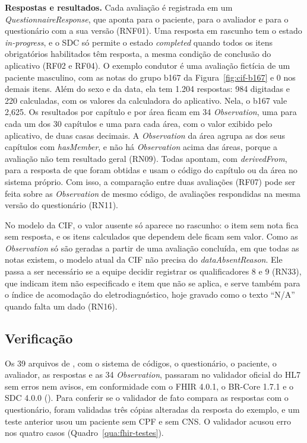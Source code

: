 \textbf{Respostas e resultados.} Cada avaliação é registrada em um \textit{QuestionnaireResponse}, que aponta para o
paciente, para o avaliador e para o questionário com a sua versão (RNF01). Uma resposta em rascunho tem o estado
\textit{in-progress}, e o SDC só permite o estado \textit{completed} quando todos os itens obrigatórios habilitados
têm resposta, a mesma condição de conclusão do aplicativo (RF02 e RF04). O exemplo condutor é uma avaliação fictícia
de um paciente masculino, com as notas do grupo b167 da Figura~\ref{fig:cif-b167} e 0 nos demais itens. Além do sexo
e da data, ela tem 1.204 respostas: 984 digitadas e 220 calculadas, com os valores da calculadora do aplicativo.
Nela, o b167 vale 2,625. Os resultados por capítulo e por área ficam em 34 \textit{Observation}, uma para cada um dos
30 capítulos e uma para cada área, com o valor exibido pelo aplicativo, de duas casas decimais. A
\textit{Observation} da área agrupa as dos seus capítulos com \textit{hasMember}, e não há \textit{Observation} acima
das áreas, porque a avaliação não tem resultado geral (RN09). Todas apontam, com \textit{derivedFrom}, para a resposta
de que foram obtidas e usam o código do capítulo ou da área no sistema próprio. Com isso, a comparação entre duas
avaliações (RF07) pode ser feita sobre as \textit{Observation} de mesmo código, de avaliações respondidas na mesma
versão do questionário (RN11).

No modelo da CIF, o valor ausente só aparece no rascunho: o item sem nota fica sem resposta, e os itens calculados que
dependem dele ficam sem valor. Como as \textit{Observation} só são geradas a partir de uma avaliação concluída, em que
todas as notas existem, o modelo atual da CIF não precisa do \textit{dataAbsentReason}. Ele passa a ser necessário se
a equipe decidir registrar os qualificadores 8 e 9 (RN33), que indicam item não especificado e item que não se
aplica, e serve também para o índice de acomodação do eletrodiagnóstico, hoje gravado como o texto ``N/A'' quando
falta um dado (RN16).

\subsection{Verificação}
\label{sec:fhir-verificacao}

Os 39 arquivos de , com o sistema de códigos, o questionário, o paciente, o avaliador, as
respostas e as 34 \textit{Observation}, passaram no validador oficial do HL7 sem erros nem avisos, em conformidade com
o FHIR 4.0.1, o BR-Core 1.7.1 e o SDC 4.0.0 (). Para conferir se o validador de
fato compara as respostas com o questionário, foram validadas três cópias alteradas da resposta do exemplo, e um
teste anterior usou um paciente sem CPF e sem CNS. O validador acusou erro nos quatro casos
(Quadro~\ref{qua:fhir-testes}).

